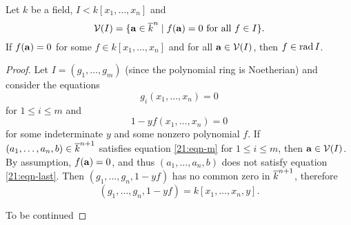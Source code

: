 \begin{thm}
  Let $k$ be a field, $I<k[x_1,\ldots,x_n]$ and
  \[ \mathcal{V}(I) = \{ \mathbf{a} \in \overline k^n \mid f(\mathbf{a}) = 0 \text{ for all } f \in I \}. \]
  If $f(\mathbf{a})=0$ for some $f \in k[x_1,\ldots,x_n]$ and for all $\mathbf{a} \in \mathcal{V}(I)$, then $f \in \operatorname{rad} I$.
\end{thm}

\begin{proof}
  Let $I = (g_1,\ldots,g_m)$ (since the polynomial ring is Noetherian) and consider the equations
  \begin{equation}\label{21:eqn-m}
    g_i(x_1,\ldots,x_n)=0
  \end{equation}
  for $1 \leq i \leq m$ and
  \begin{equation}\label{21:eqn-last}
    1-yf(x_1,\ldots,x_n)=0
  \end{equation}
  for some indeterminate $y$ and some nonzero polynomial $f$.
  If $(a_1,\ldots,a_n,b) \in \overline k^{n+1}$ satisfies equation \ref{21:eqn-m} for $1 \leq i \leq m$, then $\mathbf{a} \in \mathcal{V}(I)$.
  By assumption, $f(\mathbf{a})=0$, and thus $(a_1,\ldots,a_n,b)$ does not satisfy equation \ref{21:eqn-last}.
  Then $(g_1,\ldots,g_n,1-yf)$ has no common zero in $\overline k^{n+1}$, therefore
  \[ (g_1,\ldots,g_n,1-yf) = k[x_1,\ldots,x_n,y]. \]

  To be continued
\end{proof}
